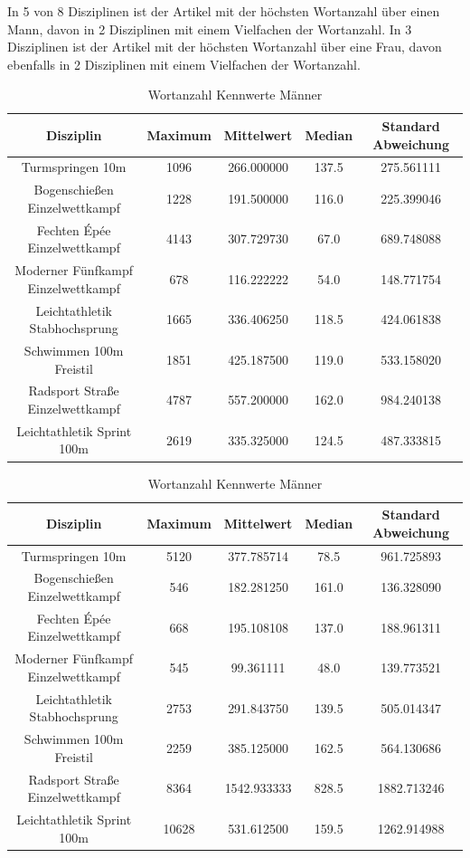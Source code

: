 \documentclass[11pt]{article}
\begin{document}
In 5 von 8 Disziplinen ist der Artikel mit der höchsten Wortanzahl über einen Mann, davon in 2 Disziplinen mit einem Vielfachen der Wortanzahl.
In 3 Disziplinen ist der Artikel mit der höchsten Wortanzahl über eine Frau, davon ebenfalls in 2 Disziplinen mit einem Vielfachen der Wortanzahl. 

\begin{table}
\begin{tabular}{ c|c|c|c|c }
  Disziplin & Maximum & Mittelwert & Median & Standard Abweichung \\
  \hline
  Turmspringen 10m & 1096 & 266.000000 & 137.5 & 275.561111\\
  Bogenschießen Einzelwettkampf & 1228 & 191.500000 & 116.0 & 225.399046\\
  Fechten Épée Einzelwettkampf & 4143& 307.729730 & 67.0 & 689.748088\\
  Moderner Fünfkampf Einzelwettkampf & 678& 116.222222 & 54.0& 148.771754\\
  Leichtathletik Stabhochsprung & 1665 & 336.406250 & 118.5 & 424.061838\\
  Schwimmen 100m Freistil & 1851 & 425.187500 & 119.0 & 533.158020\\
  Radsport Straße Einzelwettkampf & 4787& 557.200000 & 162.0 & 984.240138\\
  Leichtathletik Sprint 100m & 2619& 335.325000 & 124.5& 487.333815\\
\end{tabular}
\caption{\label{tab:table-name}Wortanzahl Kennwerte Männer}
\end{table}

\begin{table}
\begin{tabular}{ c|c|c|c|c }
  Disziplin & Maximum & Mittelwert & Median & Standard Abweichung \\
  \hline
  Turmspringen 10m & 5120 & 377.785714 & 78.5 & 961.725893\\
  Bogenschießen Einzelwettkampf & 546 & 182.281250 & 161.0 & 136.328090\\
  Fechten Épée Einzelwettkampf & 668 & 195.108108 & 137.0 & 188.961311\\
  Moderner Fünfkampf Einzelwettkampf & 545 & 99.361111 & 48.0 & 139.773521\\
  Leichtathletik Stabhochsprung & 2753 & 291.843750 & 139.5 & 505.014347\\
  Schwimmen 100m Freistil & 2259 & 385.125000 & 162.5 & 564.130686\\
  Radsport Straße Einzelwettkampf & 8364 & 1542.933333 & 828.5 & 1882.713246\\
  Leichtathletik Sprint 100m & 10628 & 531.612500 & 159.5 & 1262.914988\\
\end{tabular}
\caption{\label{tab:table-name}Wortanzahl Kennwerte Männer}
\end{table}
\end{document}

